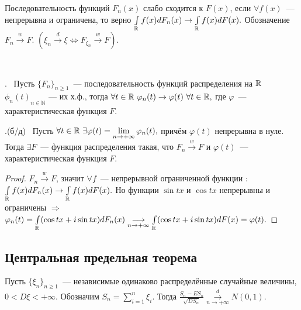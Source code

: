 	\begin{definition}
		Последовательность функций \(F_n(x)\) слабо сходится к \(F(x)\), если \(\forall f(x)\)~---  непрерывна и ограничена, то верно \(\int\limits_{\mathbb{R}} f(x) dF_n(x) \to \int\limits_{\mathbb{R}} f(x)dF(x).\) Обозначение \(F_n \overset{w}{\longrightarrow}F.\)
		\((\xi_n \overset{d}{\longrightarrow}\xi \Leftrightarrow F_{\xi_n} \overset{w}{\longrightarrow}F).\)
	\end{definition}
	\begin{theorem}~~~~~~~~~~~~~~~~~~~~~~~~~~~~~~~~~~~~~~~~~

		. ~Пусть \(\{F_n\}_{n \geqslant 1}\)~--- последовательность функций распределения на \(\mathbb{R}\) \({\phi_n(t)}_{n \in \mathbb{N}}\) --- их х.ф., тогда \(\forall t \in \mathbb{R}~\varphi_n(t) \to \varphi(t) ~ \forall t \in \mathbb{R}, \) где \(\varphi\)~--- характеристическая функция \(F\).
		
		.(б/д)~ Пусть \(\forall t \in \mathbb{R} ~ \exists \varphi(t) = \lim\limits_{n \to +\infty} \varphi_n(t), \) причём \(\varphi(t)\) непрерывна в нуле. Тогда \(\exists F\)~--- функция распределения такая, что \(F_n \overset{w}{\longrightarrow}F\) и \(\varphi(t)\)~---характеристическая функция \(F\).
	\end{theorem}

	\begin{proof}
		\(F_n \overset{w}{\longrightarrow} F \), значит \(\forall f\)~--- непрерывной ограниченной функции : \(\int\limits_{\mathbb{R}} f(x)dF_n(x) \to \int\limits_{\mathbb{R}} f(x)dF(x).\) Но функции \(\sin tx \) и \(\cos tx\) непрерывны и ограничены \(\Rightarrow\) \(\varphi_n(t) = \int\limits_{\mathbb{R}} (\cos tx + i\sin tx)dF_n(x) \underset{n \to +\infty}{\longrightarrow} \int\limits_{\mathbb{R}} (\cos tx + i\sin tx)dF(x) = \varphi(t).\)
	\end{proof}

	\subsection{Центральная предельная теорема}
	\begin{theorem}
		Пусть \(\{\xi_n\}_{n\geqslant 1}\)~--- независимые одинаково распределённые случайные величины, \(0 < D\xi < +\infty.\)
		Обозначим \(S_n = \sum\limits_{i = 1}^{n}\xi_i.\) Тогда 
		\(\frac{S_n - ES_n}{\sqrt{DS_n}} \overset{d}{\underset{n \to +\infty}{\longrightarrow}}N(0, 1).\)
	\end{theorem}

